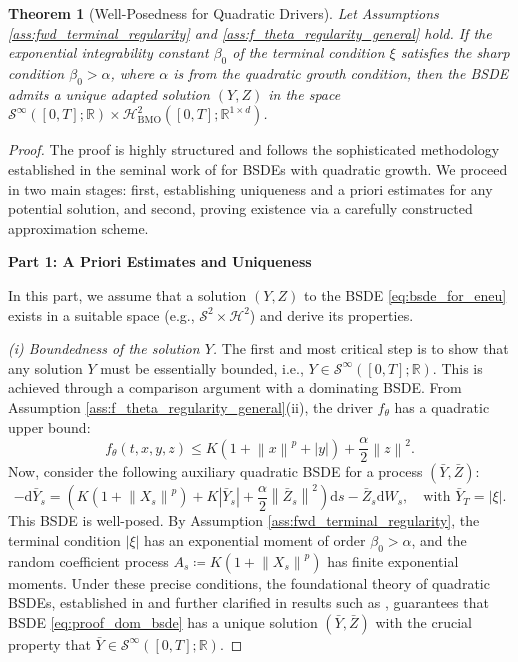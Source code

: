 \documentclass[qian]{imsart}
\newcommand{\R}{\mathbb{R}}
\newcommand{\dd}{\mathrm{d}}
\newcommand{\norm}[1]{\left\lVert#1\right\rVert}
\newcommand{\abs}[1]{\left\lvert#1\right\rvert}
\theoremstyle{plain}
\newtheorem{theorem}{Theorem}[section]
\theoremstyle{definition}
\begin{document}
\begin{theorem}[Well-Posedness for Quadratic Drivers]
\label{thm:wellposedness_quadratic}
Let Assumptions \ref{ass:fwd_terminal_regularity} and \ref{ass:f_theta_regularity_general} hold. If the exponential integrability constant $\beta_0$ of the terminal condition $\xi$ satisfies the sharp condition $\beta_0 > \alpha$, where $\alpha$ is from the quadratic growth condition, then the BSDE admits a unique adapted solution $(Y,Z)$ in the space $\mathcal{S}^{\infty}([0,T]; \R) \times \mathcal{H}^2_{\mathrm{BMO}}([0,T]; \R^{1 \times d})$.
\end{theorem}

\begin{proof}
The proof is highly structured and follows the sophisticated methodology established in the seminal work of \cite{Kobylanski2000} for BSDEs with quadratic growth. We proceed in two main stages: first, establishing uniqueness and a priori estimates for any potential solution, and second, proving existence via a carefully constructed approximation scheme.

\textbf{Part 1: A Priori Estimates and Uniqueness}

In this part, we assume that a solution $(Y,Z)$ to the BSDE \eqref{eq:bsde_for_eneu} exists in a suitable space (e.g., $\mathcal{S}^2 \times \mathcal{H}^2$) and derive its properties.

\emph{(i) Boundedness of the solution $Y$.}
The first and most critical step is to show that any solution $Y$ must be essentially bounded, i.e., $Y \in \mathcal{S}^{\infty}([0,T]; \R)$. This is achieved through a comparison argument with a dominating BSDE. From Assumption \ref{ass:f_theta_regularity_general}(ii), the driver $f_\theta$ has a quadratic upper bound:
\[ f_\theta(t,x,y,z) \le K(1 + \norm{x}^p + \abs{y}) + \frac{\alpha}{2}\norm{z}^2. \]
Now, consider the following auxiliary quadratic BSDE for a process $(\bar{Y}, \bar{Z})$:
\begin{equation}\label{eq:proof_dom_bsde}
    -\dd\bar{Y}_s = \left( K(1 + \norm{X_s}^p) + K\abs{\bar{Y}_s} + \frac{\alpha}{2}\norm{\bar{Z}_s}^2 \right) \dd s - \bar{Z}_s \dd W_s, \quad \text{with } \bar{Y}_T = \abs{\xi}.
\end{equation}
This BSDE is well-posed. By Assumption \ref{ass:fwd_terminal_regularity}, the terminal condition $\abs{\xi}$ has an exponential moment of order $\beta_0 > \alpha$, and the random coefficient process $A_s \coloneqq K(1 + \norm{X_s}^p)$ has finite exponential moments. Under these precise conditions, the foundational theory of quadratic BSDEs, established in \cite{Kobylanski2000} and further clarified in results such as \cite{BriandEtAl2003}, guarantees that BSDE \eqref{eq:proof_dom_bsde} has a unique solution $(\bar{Y}, \bar{Z})$ with the crucial property that $\bar{Y} \in \mathcal{S}^{\infty}([0,T]; \R)$.


\end{proof}
\end{document}
